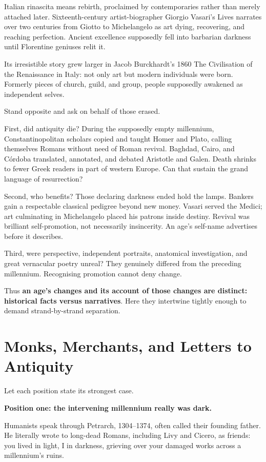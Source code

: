 Italian rinascita means rebirth, proclaimed by contemporaries rather than merely attached later. Sixteenth-century artist-biographer Giorgio Vasari's Lives narrates over two centuries from Giotto to Michelangelo as art dying, recovering, and reaching perfection. Ancient excellence supposedly fell into barbarian darkness until Florentine geniuses relit it.

Its irresistible story grew larger in Jacob Burckhardt's 1860 The Civilisation of the Renaissance in Italy: not only art but modern individuals were born. Formerly pieces of church, guild, and group, people supposedly awakened as independent selves.

Stand opposite and ask on behalf of those erased.

First, did antiquity die? During the supposedly empty millennium, Constantinopolitan scholars copied and taught Homer and Plato, calling themselves Romans without need of Roman revival. Baghdad, Cairo, and Córdoba translated, annotated, and debated Aristotle and Galen. Death shrinks to fewer Greek readers in part of western Europe. Can that sustain the grand language of resurrection?

Second, who benefits? Those declaring darkness ended hold the lamps. Bankers gain a respectable classical pedigree beyond new money. Vasari served the Medici; art culminating in Michelangelo placed his patrons inside destiny. Revival was brilliant self-promotion, not necessarily insincerity. An age's self-name advertises before it describes.

Third, were perspective, independent portraits, anatomical investigation, and great vernacular poetry unreal? They genuinely differed from the preceding millennium. Recognising promotion cannot deny change.

Thus \textbf{an age's changes and its account of those changes are distinct: historical facts versus narratives}. Here they intertwine tightly enough to demand strand-by-strand separation.

\section{Monks, Merchants, and Letters to Antiquity}
Let each position state its strongest case.

\textbf{Position one: the intervening millennium really was dark.}

Humanists speak through Petrarch, 1304--1374, often called their founding father. He literally wrote to long-dead Romans, including Livy and Cicero, as friends: you lived in light, I in darkness, grieving over your damaged works across a millennium's ruins.

